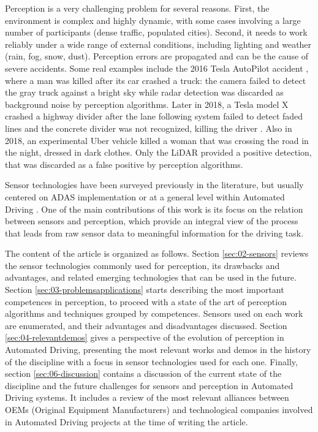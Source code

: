 Perception is a very challenging problem for several
reasons. First, the environment is complex and highly dynamic, with some cases
involving a large number of participants (dense traffic, populated cities). 
Second, it needs to work reliably under a wide range of external conditions, 
including lighting and weather (rain, fog, snow, dust). 
Perception errors are propagated and can be the cause of severe accidents. 
Some real examples include the 2016 Tesla AutoPilot accident \cite{NTSB2017},
where a man was killed after its car crashed a truck: 
the camera failed to detect the gray truck against a bright sky while radar
detection was discarded as background noise by perception algorithms.
Later in 2018, a Tesla model X crashed a highway divider after the lane
following system failed to detect faded lines and the concrete divider was not
recognized, killing the driver \cite{NTSB2018a}.
Also in 2018, an experimental Uber vehicle killed a woman that was
crossing the road \cite{NTSB2018} in the night, dressed in dark clothes. 
Only the LiDAR provided a positive detection, that was discarded as a false
positive by perception algorithms.

Sensor technologies have been surveyed previously in the literature, 
but usually centered on ADAS implementation \cite{Yenkanchi2016,Ziebinski2016a} 
or at a general level within Automated Driving \cite{Pendleton2017}. 
One of the main contributions of this work is its focus on the relation between 
sensors and perception, which provide an integral view of the process that 
leads from raw sensor data to meaningful information for the driving task.

The content of the article is organized as follows. Section 
\ref{sec:02-sensors} reviews the sensor technologies commonly used for 
perception, its drawbacks and advantages, and related emerging 
technologies that can be used in the future. 
Section \ref{sec:03-problemsapplications} starts describing the most important 
competences in perception, to proceed with a state of the art of perception 
algorithms and techniques grouped by competences. Sensors used on each work
are enumerated, and their advantages and disadvantages discussed. 
Section \ref{sec:04-relevantdemos} gives a perspective of the evolution of
perception in Automated Driving, presenting the most relevant works and demos
in the history of the discipline with a focus in sensor technologies used for
each one. 
Finally, section \ref{sec:06-discussion} contains a discussion of the current
state of the discipline and the future challenges for sensors and perception in
Automated Driving systems. It includes a review of the most relevant alliances 
between OEMs (Original Equipment Manufacturers) and technological companies
involved in Automated Driving projects at the time of writing the article.
